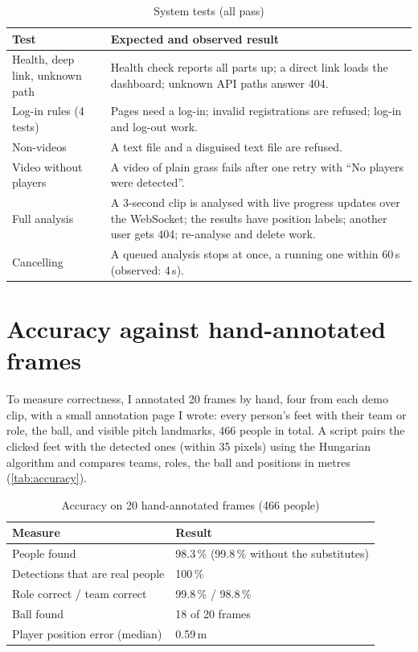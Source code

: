 \begin{table}[H]
	\centering
	\begin{tabular}{|p{}|p{}|}
		\hline
		\textbf{Test} & \textbf{Expected and observed result} \\
		\hline
		Health, deep link, unknown path & Health check reports all parts up; a direct link loads the dashboard; unknown API paths answer 404. \\
		\hline
		Log-in rules (4 tests) & Pages need a log-in; invalid registrations are refused; log-in and log-out work. \\
		\hline
		Non-videos & A text file and a disguised text file are refused. \\
		\hline
		Video without players & A video of plain grass fails after one retry with ``No players were detected''. \\
		\hline
		Full analysis & A 3-second clip is analysed with live progress updates over the WebSocket; the results have position labels; another user gets 404; re-analyse and delete work. \\
		\hline
		Cancelling & A queued analysis stops at once, a running one within 60\,s (observed: 4\,s). \\
		\hline
	\end{tabular}
	\caption{System tests (all pass)}
	\label{tab:system-tests}
\end{table}

\section{Accuracy against hand-annotated frames}
\label{sec:accuracy}

To measure correctness, I annotated 20 frames by hand, four from each demo clip, with a small annotation page I wrote: every person's feet with their team or role, the ball, and visible pitch landmarks, 466 people in total. A script pairs the clicked feet with the detected ones (within 35 pixels) using the Hungarian algorithm and compares teams, roles, the ball and positions in metres (\autoref{tab:accuracy}).

\begin{table}[H]
	\centering
	\begin{tabular}{|p{}|p{}|}
		\hline
		\textbf{Measure} & \textbf{Result} \\
		\hline
		People found & 98.3\,\% (99.8\,\% without the substitutes) \\
		\hline
		Detections that are real people & 100\,\% \\
		\hline
		Role correct / team correct & 99.8\,\% / 98.8\,\% \\
		\hline
		Ball found & 18 of 20 frames \\
		\hline
		Player position error (median) & 0.59\,m \\
		\hline
	\end{tabular}
	\caption{Accuracy on 20 hand-annotated frames (466 people)}
	\label{tab:accuracy}
\end{table}

